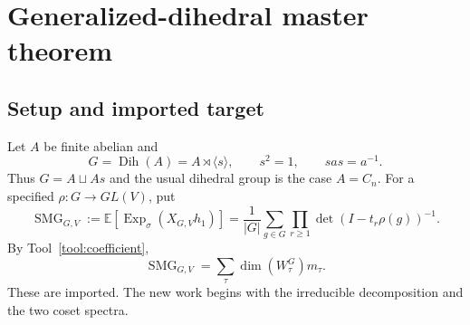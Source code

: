 \documentclass[10pt]{article}
\newcommand{\Sym}{\operatorname{Sym}}
\newcommand{\ExpS}{\operatorname{Exp}_{\sigma}}
\newcommand{\SMG}{\operatorname{SMG}}
\newcommand{\smgv}[2]{\mathbb E\!\left[\ExpS\!\left(X_{#1,#2}h_1\right)\right]}
\newcommand{\C}{\mathbb C}
\newcommand{\Z}{\mathbb Z}
\begin{document}
\section{Generalized-dihedral master theorem}\label{proof:generalized-dihedral}
\begingroup
{}
\providecommand{\C}{\mathbb C}
\renewcommand{\C}{\mathbb C}
\providecommand{\Z}{\mathbb Z}
\renewcommand{\Z}{\mathbb Z}
\providecommand{\Sym}{\operatorname{Sym}}
\renewcommand{\Sym}{\operatorname{Sym}}
\providecommand{\Dih}{\operatorname{Dih}}
\renewcommand{\Dih}{\operatorname{Dih}}
\providecommand{\Exp}{\operatorname{Exp}}
\renewcommand{\Exp}{\operatorname{Exp}}
\providecommand{\tr}{\operatorname{tr}}
\renewcommand{\tr}{\operatorname{tr}}
\providecommand{\diag}{\operatorname{diag}}
\renewcommand{\diag}{\operatorname{diag}}
\providecommand{\Mcal}{\SMG}
\renewcommand{\Mcal}{\SMG}
\providecommand{\Rcal}{\mathcal R}
\renewcommand{\Rcal}{\mathcal R}
\providecommand{\Scal}{\SMG}
\renewcommand{\Scal}{\SMG}
\setcounter{theorem}{0}
\setcounter{proposition}{0}
\setcounter{lemma}{0}
\setcounter{corollary}{0}
\setcounter{remark}{0}
\begin{abstract}
Let $G=\Dih(A)=A\rtimes C_2$ for a finite abelian group $A$, where the
nontrivial element acts on $A$ by inversion.  This note classifies the complex
irreducible representations of $G$ and proves a refined Molien formula for an
arbitrary finite-dimensional representation.  The formula is then checked by
an independent full-matrix computation: the accompanying marimo notebook
constructs every represented group element, constructs the action on tensor
products of symmetric powers, and compares the rank of the Reynolds projector
with coefficient extraction from the claimed formula.  All 33 representative
checks passed, covering cyclic and noncyclic $A$, odd and even orders,
one- and two-dimensional irreducible blocks, repeated blocks, and
representation dimensions from $2$ through $5$.
\end{abstract}

\subsection{Setup and imported target}
Let $A$ be finite abelian and
\[
G=\Dih(A)=A\rtimes\langle s\rangle,\qquad s^2=1,\qquad sas=a^{-1}.
\]
Thus $G=A\sqcup As$ and the usual dihedral group is the case $A=C_n$. For a
specified $\rho:G\to GL(V)$, put
\begin{equation}\label{generalized-dihedral-master-theorem:eq:molien-identity}
\Mcal_{G,V}:=\smgv{G}{V}
=\frac1{|G|}\sum_{g\in G}\prod_{r\ge1}\det(I-t_r\rho(g))^{-1}.
\end{equation}
By Tool~\ref{tool:coefficient},
\begin{equation}\label{generalized-dihedral-master-theorem:eq:invariant-identity}
\Mcal_{G,V}=\sum_\tau\dim(W_\tau^G)m_\tau.
\end{equation}
These are imported. The new work begins with the irreducible decomposition and
the two coset spectra.
\end{document}

